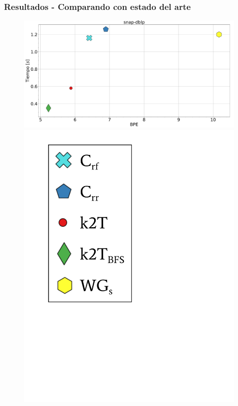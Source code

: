 \begin{frame}
\frametitle{Resultados - Comparando con estado del arte}

\begin{figure}
	\centering
	
    	\begin{minipage}{1\textwidth}
    		\centering
    		\begin{minipage}{0.8\textwidth}
    			\centering
    			\includegraphics[width=1\linewidth]{../img/bpeTimes/secuencial/snap-dblp.pdf}
    		\end{minipage}
    		\begin{minipage}{0.15\textwidth}
    			\centering
    			\includegraphics[scale=.16, clip, trim=70 200 280 40]{../img/bpeTimes/labelSec.pdf}
    		\end{minipage}	
    	\end{minipage}


\end{figure}
\end{frame}
